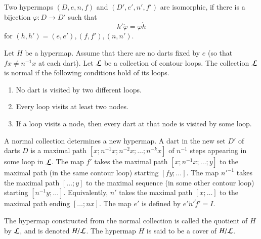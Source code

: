 \begin{definition}[isomorphic] Two hypermaps $(D,e,n,f)$ and $(D',e',n',f')$ are
isomorphic, if there is a bijection $\varphi:D\to D'$ such that
    $$h'\ocirc \varphi = \varphi\ocirc h$$
for $(h,h')=(e,e'), (f,f'), (n,n')$.
\end{definition}


\begin{definition}
Let $H$ be a hypermap. Assume that 
there are no darts fixed by $e$ 
(so that $f x \ne n^{-1} x$ at each dart). 
Let $\cal L$ be a collection of contour
loops.  The collection $\cal L$ is  normal if the following
conditions hold of its loops. \begin{enumerate}
 \item No dart is visited by two different loops.
 \item Every loop visits at least two nodes.
 \item If a loop visits a node, then every dart at that node is visited by some loop.
\end{enumerate}
\end{definition}

A normal collection determines a new hypermap.   A dart in the new set $D'$ of darts $D$ is a maximal path $[x;n^{-1} x; n^{-2} x;\ldots;n^{-k} x]$  of $n^{-1}$ steps appearing in some loop in $\cal L$. The map $f'$ takes the maximal path $[x;n^{-1}x;\ldots;y]$ to the maximal path (in the same contour loop) starting $[f y;\ldots]$. The map ${n'}^{-1}$ takes the maximal path  $[\ldots;y]$ to the maximal sequence (in some other contour loop) starting $[n^{-1}y;\ldots]$. Equivalently, $n'$ takes the maximal path $[x;\ldots]$ to the maximal path ending $[\ldots;n x]$. The map $e'$ is defined by $e'\ocirc n'\ocirc f' = I$. 

\begin{definition}[quotient]  The hypermap constructed from the normal collection is called the quotient of $H$ by $\cal L$, and is denoted $H/{\cal L}$.  The hypermap $H$ is said to be a cover of $H/{\cal L}$.
\end{definition}

